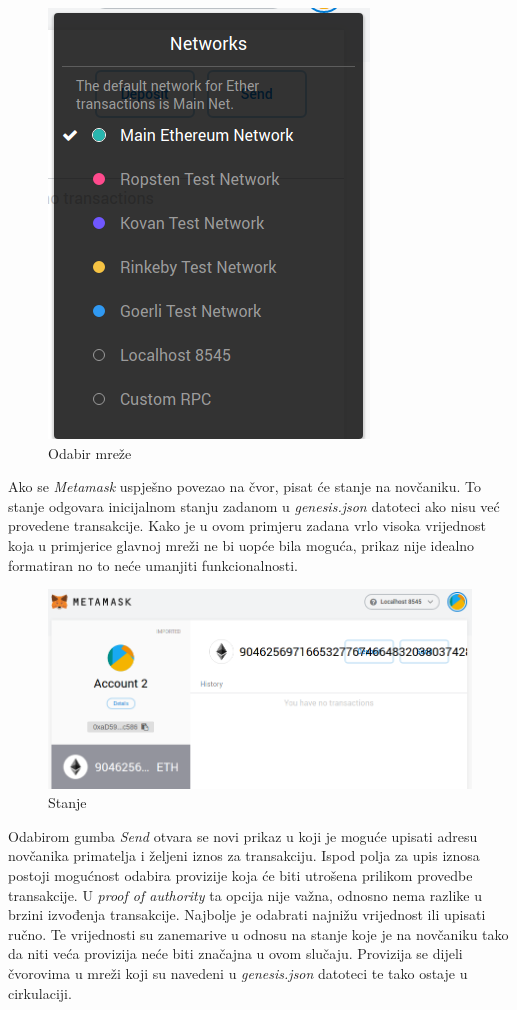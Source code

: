 \documentclass[times, utf8, zavrsni, numeric]{fer}
\begin{document}
\begin{figure}[ht]
  \centering
  \includegraphics[scale=0.5]{mmnetworkdd.png}
  \caption{Odabir mreže}
\end{figure}

Ako se \emph{Metamask} uspješno povezao na čvor, pisat će stanje na novčaniku. To stanje odgovara inicijalnom stanju zadanom u \emph{genesis.json} datoteci ako
nisu već provedene transakcije. Kako je u ovom primjeru zadana vrlo visoka vrijednost koja u primjerice glavnoj mreži ne bi uopće bila moguća, prikaz nije idealno
formatiran no to neće umanjiti funkcionalnosti.

\begin{figure}[ht]
  \includegraphics[width=\textwidth]{mmimported.png}
  \caption{Stanje}
  \centering
\end{figure}

Odabirom gumba \emph{Send} otvara se novi prikaz u koji je moguće upisati adresu novčanika primatelja i željeni iznos za transakciju. Ispod polja za upis iznosa
postoji mogućnost odabira provizije koja će biti utrošena prilikom provedbe transakcije. U \emph{proof of authority} ta opcija nije važna, odnosno nema razlike u brzini
izvođenja transakcije. Najbolje je odabrati najnižu vrijednost ili upisati ručno. Te vrijednosti su zanemarive u odnosu na stanje koje je na novčaniku tako da niti veća
provizija neće biti značajna u ovom slučaju. Provizija se dijeli čvorovima u mreži koji su navedeni u \emph{genesis.json} datoteci te tako ostaje u cirkulaciji.
\end{document}
